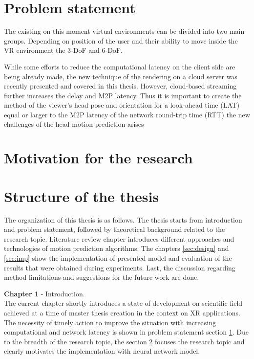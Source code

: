 \section{Problem statement}
\label{sec:intro:problem}
The existing on this moment virtual environments can be divided into two main groups. Depending on position of the user and their ability to move inside the VR environment the 3-DoF and 6-DoF. 

While some efforts to reduce the computational latency on the client side are being already made, the new technique of the rendering on a cloud server was recently presented and covered in this thesis. However, cloud-based streaming further increases the delay and M2P latency. Thus it is important to create the method of the viewer's head pose and orientation for a look-ahead time (LAT) equal or larger to the M2P latency of the network round-trip time (RTT) the new challenges of the head motion prediction arises 

\section{Motivation for the research}
\label{sec:intro:motivation}



\section{Structure of the thesis}
\label{sec:intro:structure}
The organization of this thesis is as follows. The thesis starts from introduction and problem statement, followed by theoretical background related to the research topic. Literature review chapter introduces different approaches and  technologies of motion prediction algorithms. The chapters \ref{sec:design} and \ref{sec:imp} show the implementation of presented model and evaluation of the results that were obtained during experiments. Last, the discussion regarding method limitations and suggestions for the future work are done.

\textbf{Chapter 1} - Introduction.\\
The current chapter shortly introduces a state of development on scientific field achieved at a time of master thesis creation in the context on XR applications. The necessity of timely action to improve the situation with increasing computational and network latency is shown in problem statement section \ref{sec:intro:problem}. Due to the breadth of the research topic, the section \ref{sec:intro:motivation} focuses the research topic and clearly motivates the implementation with neural network model. 

